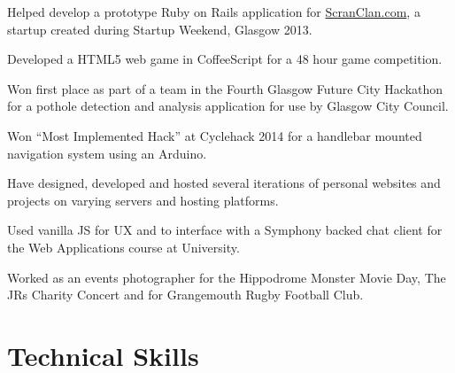 \documentclass[11pt,a4paper]{article}
\renewenvironment{itemize}{
  \begin{list}{}{
    \setlength{\leftmargin}{1em}
    \setlength{\itemsep}{0.25em}
    \setlength{\parskip}{0pt}
    \setlength{\parsep}{0.25em}
    \renewcommand{\labelitemi}{$\bullet$}
  }
}{
  \end{list}
}
\begin{document}
\begin{itemize}
    \item Helped develop a prototype Ruby on Rails application for \href{http://www.ScranClan.com}{ScranClan.com}, a startup created during Startup Weekend, Glasgow 2013.
    \item Developed a HTML5 web game in CoffeeScript for a 48 hour game
        competition.
    \item Won first place as part of a team in the Fourth Glasgow Future City Hackathon for a pothole detection and analysis application for use by Glasgow City Council.
    \item Won ``Most Implemented Hack'' at Cyclehack 2014 for a handlebar mounted navigation system using an Arduino.
    \item Have designed, developed and hosted several iterations of personal websites and projects on varying servers and hosting platforms.
    \item Used vanilla JS for UX and to interface with a Symphony backed chat client for the Web Applications course at University.
    \item Worked as an events photographer for the Hippodrome Monster Movie Day, The JRs Charity Concert and for Grangemouth Rugby Football Club.
\end{itemize}

\section*{Technical Skills}

\end{document}
